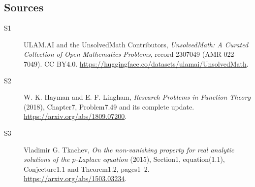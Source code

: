 \documentclass[11pt]{article}
\begin{document}
\subsection{Sources}
\begin{description}
\item[\hypertarget{source:2307049:1}{S1}] ULAM.AI and the UnsolvedMath Contributors, \emph{UnsolvedMath: A Curated Collection of Open Mathematics Problems}, record 2307049 (AMR-022-7049). CC BY4.0. \url{https://huggingface.co/datasets/ulamai/UnsolvedMath}.
\item[\hypertarget{source:2307049:2}{S2}] W. K. Hayman and E. F. Lingham, \emph{Research Problems in Function Theory} (2018), Chapter7, Problem7.49 and its complete update. \url{https://arxiv.org/abs/1809.07200}.
\item[\hypertarget{source:2307049:3}{S3}] Vladimir G. Tkachev, \emph{On the non-vanishing property for real analytic solutions of the $p$-Laplace equation} (2015), Section1, equation(1.1), Conjecture1.1 and Theorem1.2, pages1--2. \url{https://arxiv.org/abs/1503.03234}.
\end{description}
\label{end:2307049}
\end{document}
